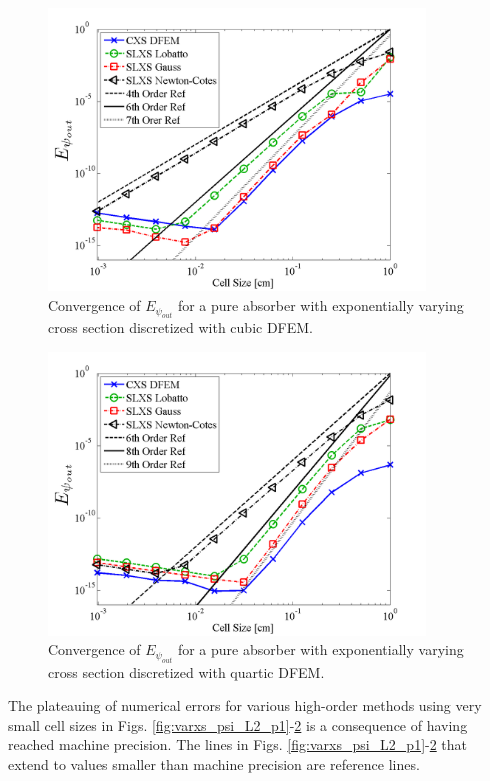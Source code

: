 %
\begin{figure}[!htp]
\centering
\includegraphics[width=10cm]{chapter3_variable_xs/P3_VarXS_E_psi_out.png}
\caption{Convergence of $E_{\psi_{out}}$  for a pure absorber with exponentially varying cross section discretized with cubic DFEM.}
\label{fig:varxs_psi_out_p3}
\end{figure}
%
\begin{figure}[!hbp]
\centering
\includegraphics[width=10cm]{chapter3_variable_xs/P4_VarXS_E_psi_out.png}
\caption{Convergence of $E_{\psi_{out}}$  for a pure absorber with exponentially varying cross section discretized with quartic DFEM.}
\label{fig:varxs_psi_out_p4}
\end{figure}
\clearpage
The plateauing of numerical errors for various high-order methods using very small cell sizes in Figs. \ref{fig:varxs_psi_L2_p1}-\ref{fig:varxs_psi_out_p4} is a consequence of having  reached machine precision.
The lines in Figs. \ref{fig:varxs_psi_L2_p1}-\ref{fig:varxs_psi_out_p4} that extend to values smaller than machine precision are reference lines.

